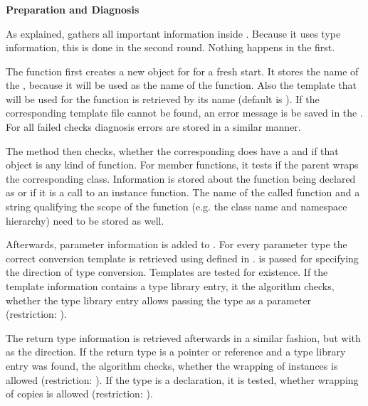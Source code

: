 \subsubsection{}

\textbf{Preparation and Diagnosis}

As explained,  gathers all important information inside \linebreak {}. Because it uses type information, this is done in the second round. Nothing happens in the first.

The function first creates a new object for  for a fresh start. It stores the name of the , because it will be used as the name of the  function. Also the template that will be used for the function is retrieved by its name (default is ). If the corresponding template file cannot be found, an error message is be saved in the . For all failed checks diagnosis errors are stored in a similar manner.

The method then checks, whether the corresponding  does have a  and if that object is any kind of function. For member functions, it tests if the parent  wraps the corresponding class. Information is stored about the function being declared as  or if it is a call to an instance function. The name of the called  function and a string qualifying the scope of the function (e.g. the class name and namespace hierarchy) need to be stored as well.

Afterwards, parameter information is added to . For every parameter type the correct conversion template is retrieved using  defined in .  is passed for specifying the direction of type conversion. Templates are tested for existence. If the template information contains a type library entry, it the algorithm checks, whether the type library entry allows passing the type as a parameter (restriction: ).

The return type information is retrieved afterwards in a similar fashion, but with  as the direction. If the return type is a pointer or reference and a type library entry was found, the algorithm checks, whether the wrapping of  instances is allowed (restriction: ). If the type is a declaration, it is tested, whether wrapping of copies is allowed (restriction: ).


